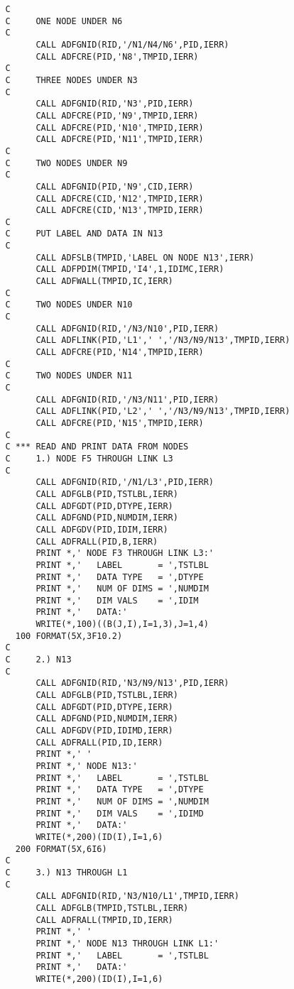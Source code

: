 \begin{verbatim}
   C
   C     ONE NODE UNDER N6
   C
         CALL ADFGNID(RID,'/N1/N4/N6',PID,IERR)
         CALL ADFCRE(PID,'N8',TMPID,IERR)
   C
   C     THREE NODES UNDER N3
   C
         CALL ADFGNID(RID,'N3',PID,IERR)
         CALL ADFCRE(PID,'N9',TMPID,IERR)
         CALL ADFCRE(PID,'N10',TMPID,IERR)
         CALL ADFCRE(PID,'N11',TMPID,IERR)
   C
   C     TWO NODES UNDER N9
   C
         CALL ADFGNID(PID,'N9',CID,IERR)
         CALL ADFCRE(CID,'N12',TMPID,IERR)
         CALL ADFCRE(CID,'N13',TMPID,IERR)
   C
   C     PUT LABEL AND DATA IN N13
   C
         CALL ADFSLB(TMPID,'LABEL ON NODE N13',IERR)
         CALL ADFPDIM(TMPID,'I4',1,IDIMC,IERR)
         CALL ADFWALL(TMPID,IC,IERR)
   C
   C     TWO NODES UNDER N10
   C
         CALL ADFGNID(RID,'/N3/N10',PID,IERR)
         CALL ADFLINK(PID,'L1',' ','/N3/N9/N13',TMPID,IERR)
         CALL ADFCRE(PID,'N14',TMPID,IERR)
   C
   C     TWO NODES UNDER N11
   C
         CALL ADFGNID(RID,'/N3/N11',PID,IERR)
         CALL ADFLINK(PID,'L2',' ','/N3/N9/N13',TMPID,IERR)
         CALL ADFCRE(PID,'N15',TMPID,IERR)
   C
   C *** READ AND PRINT DATA FROM NODES
   C     1.) NODE F5 THROUGH LINK L3
   C
         CALL ADFGNID(RID,'/N1/L3',PID,IERR)
         CALL ADFGLB(PID,TSTLBL,IERR)
         CALL ADFGDT(PID,DTYPE,IERR)
         CALL ADFGND(PID,NUMDIM,IERR)
         CALL ADFGDV(PID,IDIM,IERR)
         CALL ADFRALL(PID,B,IERR)
         PRINT *,' NODE F3 THROUGH LINK L3:'
         PRINT *,'   LABEL       = ',TSTLBL
         PRINT *,'   DATA TYPE   = ',DTYPE
         PRINT *,'   NUM OF DIMS = ',NUMDIM
         PRINT *,'   DIM VALS    = ',IDIM
         PRINT *,'   DATA:'
         WRITE(*,100)((B(J,I),I=1,3),J=1,4)
     100 FORMAT(5X,3F10.2)
   C
   C     2.) N13
   C
         CALL ADFGNID(RID,'N3/N9/N13',PID,IERR)
         CALL ADFGLB(PID,TSTLBL,IERR)
         CALL ADFGDT(PID,DTYPE,IERR)
         CALL ADFGND(PID,NUMDIM,IERR)
         CALL ADFGDV(PID,IDIMD,IERR)
         CALL ADFRALL(PID,ID,IERR)
         PRINT *,' '
         PRINT *,' NODE N13:'
         PRINT *,'   LABEL       = ',TSTLBL
         PRINT *,'   DATA TYPE   = ',DTYPE
         PRINT *,'   NUM OF DIMS = ',NUMDIM
         PRINT *,'   DIM VALS    = ',IDIMD
         PRINT *,'   DATA:'
         WRITE(*,200)(ID(I),I=1,6)
     200 FORMAT(5X,6I6)
   C
   C     3.) N13 THROUGH L1
   C
         CALL ADFGNID(RID,'N3/N10/L1',TMPID,IERR)
         CALL ADFGLB(TMPID,TSTLBL,IERR)
         CALL ADFRALL(TMPID,ID,IERR)
         PRINT *,' '
         PRINT *,' NODE N13 THROUGH LINK L1:'
         PRINT *,'   LABEL       = ',TSTLBL
         PRINT *,'   DATA:'
         WRITE(*,200)(ID(I),I=1,6)

\end{verbatim}
